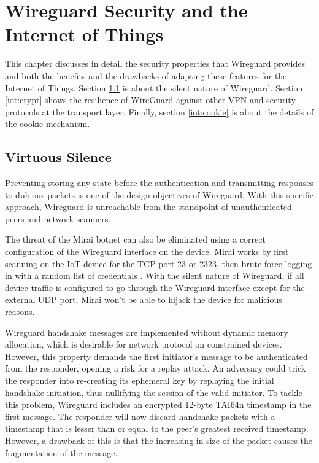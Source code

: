 \chapter{Wireguard Security and the Internet of Things} \label{chap:eval}
  This chapter discusses in detail the security properties that Wireguard provides and both the benefits
  and the drawbacks of adapting these features for the Internet of Things. Section \ref{iot:silence} is
  about the silent nature of Wireguard. Section \ref{iot:crypt} shows the resilience of WireGuard
  against other VPN and security protocols at the transport layer. Finally, section \ref{iot:cookie} is about the details of 
  the cookie mechanism. 
\section{Virtuous Silence} \label{iot:silence}
  Preventing storing any state before the authentication and transmitting responses to dubious packets
  is one of the design objectives of Wireguard. With this specific approach, Wireguard is unreachable
  from the standpoint of unauthenticated peers and network scanners. 

  The threat of the Mirai botnet can also be eliminated using a correct configuration of the
  Wireguard interface on the device. Mirai works by first scanning on the IoT device for
  the TCP port 23 or 2323, then brute-force logging in with a random list of credentials \cite{botnet}.
  With the silent nature of Wireguard, if all device traffic is configured to go through the
  Wireguard interface except for the external UDP port, Mirai won't be able to hijack the
  device for malicious reasons.

  Wireguard handshake messages are implemented without dynamic memory allocation, which is
  desirable for network protocol on constrained devices. However, this property demands the
  first initiator's message to be authenticated  from the responder, opening a risk for
  a replay attack. An adversary could trick the responder into re-creating its ephemeral key
  by replaying the initial handshake initiation, thus nullifying the session of the valid initiator.
  To tackle this problem, Wireguard includes an encrypted 12-byte TAI64n \cite{tai64} timestamp 
  in the first message. The responder will now discard handshake packets with a timestamp that 
  is lesser than or equal to the peer's greatest received timestamp. However, a drawback of 
  this is that the increasing in size of the packet causes the fragmentation of the message.
